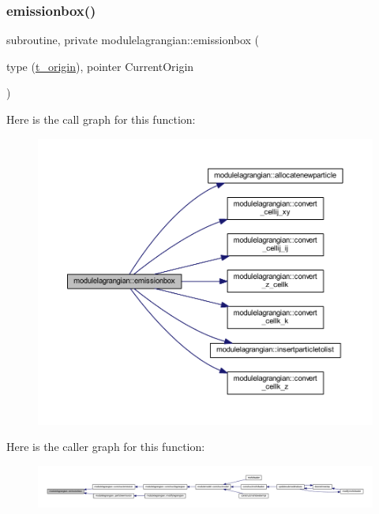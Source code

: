 \subsubsection{\texorpdfstring{emissionbox()}{emissionbox()}}
{\footnotesize\ttfamily subroutine, private modulelagrangian\+::emissionbox (\begin{DoxyParamCaption}\item[{type (\mbox{\hyperlink{structmodulelagrangian_1_1t__origin}{t\+\_\+origin}}), pointer}]{Current\+Origin }\end{DoxyParamCaption})\hspace{0.3cm}{\ttfamily [private]}}

Here is the call graph for this function\+:\nopagebreak
\begin{figure}[H]
\begin{center}
\leavevmode
\includegraphics[width=350pt]{namespacemodulelagrangian_a909284268900b0a5945c1fde9e70be9c_cgraph}
\end{center}
\end{figure}
Here is the caller graph for this function\+:\nopagebreak
\begin{figure}[H]
\begin{center}
\leavevmode
\includegraphics[width=350pt]{namespacemodulelagrangian_a909284268900b0a5945c1fde9e70be9c_icgraph}
\end{center}
\end{figure}
\mbox{\label{namespacemodulelagrangian_a2c2297af310e54bf92d0a22b49d375ca}} 

